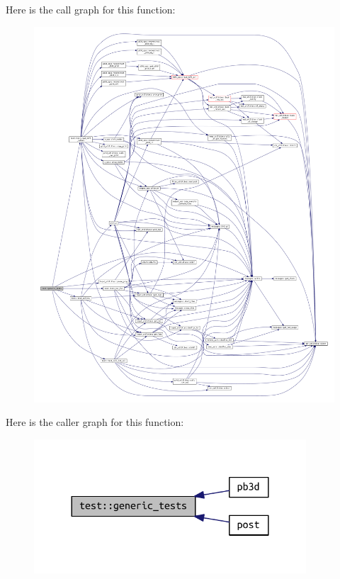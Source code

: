 Here is the call graph for this function\+:
\nopagebreak
\begin{figure}[H]
\begin{center}
\leavevmode
\includegraphics[width=350pt]{namespacetest_aca21ee464c0b1f4b617177afdde110ec_cgraph}
\end{center}
\end{figure}
Here is the caller graph for this function\+:\nopagebreak
\begin{figure}[H]
\begin{center}
\leavevmode
\includegraphics[width=288pt]{namespacetest_aca21ee464c0b1f4b617177afdde110ec_icgraph}
\end{center}
\end{figure}
\mbox{\label{namespacetest_a0d4cb791bf762b2e52260fea7644a3ee}} 

